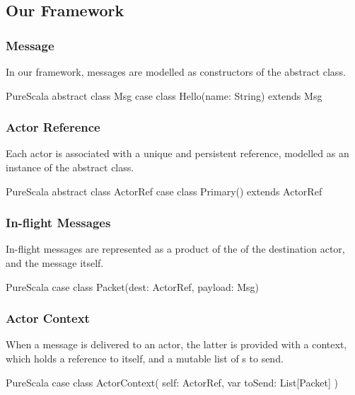 
\subsection{Our Framework}

\subsubsection*{Message}

In our framework, messages are modelled as constructors of the  abstract class.

\begin{ShortCode}{PureScala}
abstract class Msg
case class Hello(name: String) extends Msg
\end{ShortCode}

\subsubsection*{Actor Reference}

Each actor is associated with a unique and persistent reference, modelled as an instance of the \ActorRef abstract class.

\begin{ShortCode}{PureScala}
abstract class ActorRef
case class Primary() extends ActorRef
\end{ShortCode}

\subsubsection*{In-flight Messages}

In-flight messages are represented as a product of the \ActorRef of the destination actor, and the message itself.

\begin{ShortCode}{PureScala}
case class Packet(dest: ActorRef, payload: Msg)
\end{ShortCode}

\subsubsection*{Actor Context}

When a message is delivered to an actor, the latter is provided with a context,
which holds a reference to itself, and a mutable list of s to send.

\begin{ShortCode}{PureScala}
case class ActorContext(
  self: ActorRef,
  var toSend: List[Packet]
)
\end{ShortCode}

